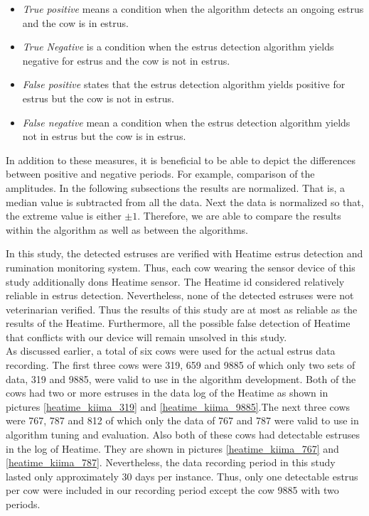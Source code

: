 \documentclass[english,12pt,a4paper,pdftex,elec,utf8]{aaltothesis}
\begin{document}
\begin{itemize}
\item \textit{True positive} means a condition when the algorithm detects an ongoing estrus and the cow is in estrus.
\item \textit{True Negative} is a condition when the estrus detection algorithm yields negative for estrus and the cow is not in estrus.
\item \textit{False positive} states that the estrus detection algorithm yields positive for estrus but the cow is not in estrus.
\item \textit{False negative} mean a condition when the estrus detection algorithm yields not in estrus but the cow is in estrus.
\end{itemize}

In addition to these measures, it is beneficial to be able to depict the differences between positive and negative periods. For example, comparison of the amplitudes. In the following subsections the results are normalized. That is, a median value is subtracted from all the data. Next the data is normalized so that, the extreme value is either $\pm1$. Therefore, we are able to compare the results within the algorithm as well as between the algorithms. 

In this study, the detected estruses are verified with Heatime estrus detection and rumination monitoring system. Thus, each cow wearing the sensor device of this study additionally dons Heatime sensor. The Heatime id considered relatively reliable in estrus detection. Nevertheless, none of the detected estruses were not veterinarian verified. Thus the results of this study are at most as reliable as the results of the Heatime. Furthermore, all the possible false detection of Heatime that conflicts with our device will remain unsolved in this study. \\
As discussed earlier, a total of six cows were used for the actual estrus data recording. The first three cows were 319, 659 and 9885 of which only two sets of data, 319 and 9885, were valid to use in the algorithm development. Both of the cows had two or more estruses in the data log of the Heatime as shown in pictures \ref{heatime_kiima_319} and \ref{heatime_kiima_9885}.The next three cows were 767, 787 and 812 of which only the data of 767 and 787 were valid to use in algorithm tuning and evaluation. Also both of these cows had detectable estruses in the log of Heatime. They are shown in pictures \ref{heatime_kiima_767} and \ref{heatime_kiima_787}. Nevertheless, the data recording period in this study lasted only approximately 30 days per instance. Thus, only one detectable estrus per cow were included in our recording period except the cow 9885 with two periods.
\end{document}
